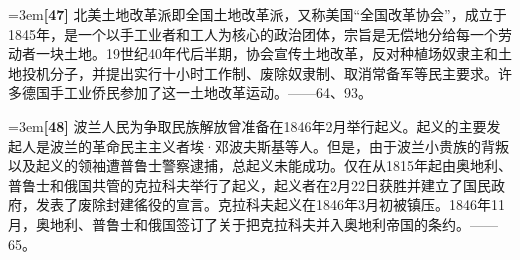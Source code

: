 \documentclass[UTF8,zihao=-4,a4paper]{ctexart}
\begin{document}
\noindent\hangindent=3em\textbf{[47]} 北美土地改革派即全国土地改革派，又称美国“全国改革协会”，成立于1845年，是一个以手工业者和工人为核心的政治团体，宗旨是无偿地分给每一个劳动者一块土地。19世纪40年代后半期，协会宣传土地改革，反对种植场奴隶主和土地投机分子，并提出实行十小时工作制、废除奴隶制、取消常备军等民主要求。许多德国手工业侨民参加了这一土地改革运动。——64、93。\par
\noindent\hangindent=3em\textbf{[48]} 波兰人民为争取民族解放曾准备在1846年2月举行起义。起义的主要发起人是波兰的革命民主主义者埃·邓波夫斯基等人。但是，由于波兰小贵族的背叛以及起义的领袖遭普鲁士警察逮捕，总起义未能成功。仅在从1815年起由奥地利、普鲁士和俄国共管的克拉科夫举行了起义，起义者在2月22日获胜并建立了国民政府，发表了废除封建徭役的宣言。克拉科夫起义在1846年3月初被镇压。1846年11月，奥地利、普鲁士和俄国签订了关于把克拉科夫并入奥地利帝国的条约。——65。\par
\end{document}

